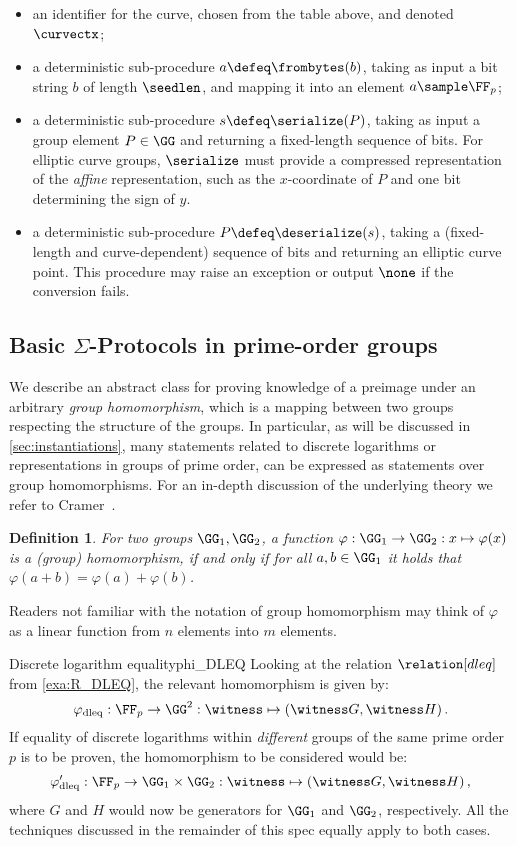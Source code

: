 \documentclass[11pt]{article}
\newtheorem{definition}{Definition}
\begin{document}
\begin{itemize}
  \item an identifier for the curve, chosen from the table above, and denoted $\curvectx$;
  \item a deterministic sub-procedure $a \defeq \frombytes(b)$, taking as input a bit string $b$ of length $\seedlen$, and mapping it into an element $a \sample \FF_p$;
  \item a deterministic sub-procedure $s \defeq \serialize(P)$, taking as input a group element $P \in \GG$ and returning a fixed-length sequence of bits.
  For elliptic curve groups, $\serialize$ must provide a compressed representation of the \emph{affine} representation, such as the $x$-coordinate of $P$ and one bit determining the sign of $y$.
  \item a deterministic sub-procedure $P \defeq \deserialize(s)$, taking a (fixed-length and curve-dependent) sequence of bits and returning an elliptic curve point. This procedure may raise an exception or output $\none$ if the conversion fails.
\end{itemize}

\subsection{Basic $\Sigma$-Protocols in prime-order groups}\label{sec:basic_sigma}
  We describe an abstract class for proving knowledge of a preimage under an arbitrary \emph{group homomorphism}, which is a mapping between two groups respecting the structure of the groups.
In particular, as will be discussed in \cref{sec:instantiations}, many statements related to discrete logarithms or representations in groups of prime order, can be expressed as statements over group homomorphisms.
For an in-depth discussion of the underlying theory we refer to Cramer~\cite{cramer97}.

\begin{definition}
  For two groups $\GG_1,\GG_2$, a function $\varphi:\GG_1\to\GG_2:x\mapsto\varphi(x)$ is a \emph{(group) homomorphism}, if and only if for all $a,b\in\GG_1$ it holds that $\varphi(a+b)=\varphi(a)+\varphi(b)$.
\end{definition}
Readers not familiar with the notation of group homomorphism may think of $\varphi$ as a linear function from $n$ elements into $m$ elements.

\begin{example}{Discrete logarithm equality}{phi_DLEQ}
  Looking at the relation $\relation[dleq]$ from \cref{exa:R_DLEQ}, the relevant homomorphism is given by:
	$$
	  \varphi_{\operatorname{dleq}} : \FF_p\to\GG^2 : \witness\mapsto (\witness G,\witness H)\,.
	$$
	If equality of discrete logarithms within \emph{different} groups of the same prime order $p$ is to be proven, the homomorphism to be considered would be:
	$$
	  \varphi_{\operatorname{dleq}}' : \FF_p\to\GG_1\times\GG_2 : \witness\mapsto (\witness G,\witness H)\,,
	$$
	where $G$ and $H$ would now be generators for $\GG_1$ and $\GG_2$, respectively.
	All the techniques discussed in the remainder of this spec equally apply to both cases.
\end{example}
\end{document}

